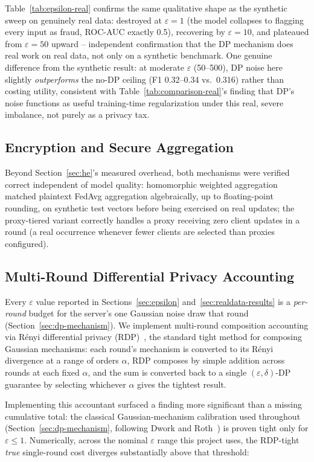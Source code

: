 \documentclass[12pt]{svproc}
\begin{document}
Table~\ref{tab:epsilon-real} confirms the same qualitative shape as the
synthetic sweep on genuinely real data: destroyed at $\varepsilon=1$
(the model collapses to flagging every input as fraud, ROC-AUC exactly
0.5), recovering by $\varepsilon=10$, and plateaued from
$\varepsilon=50$ upward -- independent confirmation that the DP
mechanism does real work on real data, not only on a synthetic
benchmark. One genuine difference from the synthetic result: at
moderate $\varepsilon$ (50--500), DP noise here slightly
\emph{outperforms} the no-DP ceiling (F1 0.32--0.34 vs.\ 0.316) rather
than costing utility, consistent with Table~\ref{tab:comparison-real}'s
finding that DP's noise functions as useful training-time
regularization under this real, severe imbalance, not purely as a
privacy tax.

\subsection{Encryption and Secure Aggregation}
Beyond Section~\ref{sec:he}'s measured overhead, both mechanisms were
verified correct independent of model quality: homomorphic weighted
aggregation matched plaintext FedAvg aggregation algebraically, up to
floating-point rounding, on synthetic test vectors before being
exercised on real updates; the proxy-tiered variant correctly handles a
proxy receiving zero client updates in a round (a real occurrence
whenever fewer clients are selected than proxies configured).

\subsection{Multi-Round Differential Privacy Accounting}
\label{sec:accounting}
Every $\varepsilon$ value reported in Sections~\ref{sec:epsilon}
and~\ref{sec:realdata-results} is a \emph{per-round} budget for the
server's one Gaussian noise draw that round
(Section~\ref{sec:dp-mechanism}). We implement multi-round composition
accounting via R\'enyi differential privacy
(RDP)~\cite{mironov2017rdp}, the standard tight method for composing
Gaussian mechanisms: each round's mechanism is converted to its R\'enyi
divergence at a range of orders $\alpha$, RDP composes by simple
addition across rounds at each fixed $\alpha$, and the sum is converted
back to a single $(\varepsilon,\delta)$-DP guarantee by selecting
whichever $\alpha$ gives the tightest result.

Implementing this accountant surfaced a finding more significant than
a missing cumulative total: the classical Gaussian-mechanism
calibration used throughout (Section~\ref{sec:dp-mechanism}, following
Dwork and Roth~\cite{dwork2014dp}) is proven tight only for
$\varepsilon \le 1$. Numerically, across the nominal $\varepsilon$
range this project uses, the RDP-tight \emph{true} single-round cost
diverges substantially above that threshold:
\end{document}
